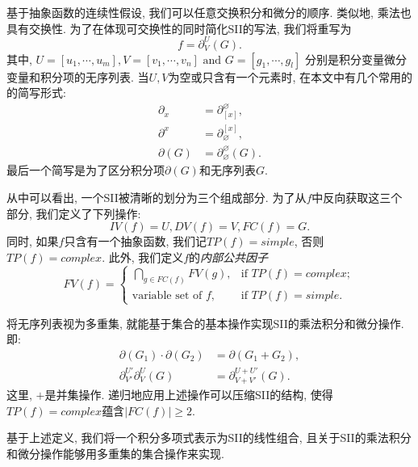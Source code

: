基于抽象函数的连续性假设, 我们可以任意交换积分和微分的顺序. 类似地, 乘法也具有交换性. 为了在体现可交换性的同时简化SII的写法, 我们将重写为
\begin{equation} 
f=\partial^U_V(G). \label{st_form}
\end{equation} 
其中,  $U=[u_1,\cdots,u_m], V=[v_1,\cdots,v_n] \text{~and~} G=[g_1,\cdots,g_l]$ 分别是积分变量\zdh 微分变量和积分项的无序列表. 当$U,V$为空或只含有一个元素时, 在本文中有几个常用的的简写形式:
\begin{equation}
\begin{split}
\partial_x&=\partial^\varnothing_{[x]},  \\
\partial^x&=\partial_\varnothing^{[x]},  \\ 
\partial(G)&=\partial^\varnothing_\varnothing(G).
\end{split}
\end{equation}
最后一个简写是为了区分积分项$\partial(G)$和无序列表$G$. 

从中可以看出, 一个SII被清晰的划分为三个组成部分. 为了从$f$中反向获取这三个部分, 我们定义了下列操作:
\begin{equation}
IV(f)=U,DV(f)=V,FC(f)=G.
\end{equation}
同时, 如果$f$只含有一个抽象函数, 我们记$TP(f)=simple$, 否则$TP(f)=complex$. 此外, 我们定义$f$的\emph{内部公共因子}
\begin{equation}    
FV(f)=\left\{
\begin{array}{cl}
\bigcap\limits_{g\in FC(f)}{FV(g)}, &\text{if }TP(f)=complex;\\ 
\text{variable set of } f,          &\text{if }TP(f)=simple.
\end{array}
\right.
\end{equation}

将无序列表视为多重集, 就能基于集合的基本操作实现SII的乘法\zdh 积分和微分操作. 即:
\begin{equation}
\begin{split}
\partial(G_1)\cdot\partial(G_2)&=\partial(G_1+G_2),\\
\partial^{U'}_{V'}\partial^{U}_{V}(G)&=\partial^{U+U'}_{V+V'}(G).
\end{split}
\label{ops}
\end{equation}
这里, $+$是并集操作. 递归地应用上述操作可以压缩SII的结构, 使得$TP(f)=complex$蕴含$|FC(f)|\ge 2$. 

基于上述定义, 我们将一个积分多项式表示为SII的线性组合, 且关于SII的乘法\zdh 积分和微分操作能够用多重集的集合操作来实现. 

